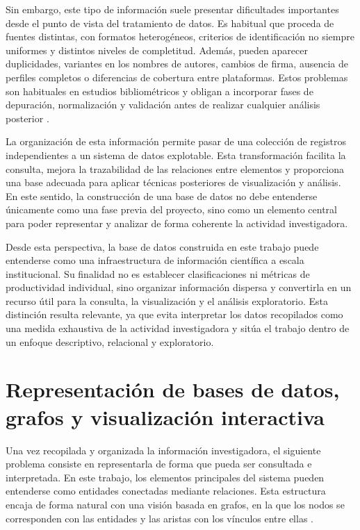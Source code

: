 \documentclass[11pt,spanish,listoffigures,listoftables]{tfgetsinf}
\begin{document}
Sin embargo, este tipo de información suele presentar dificultades importantes desde el punto de vista del tratamiento de datos. Es habitual que proceda de fuentes distintas, con formatos heterogéneos, criterios de identificación no siempre uniformes y distintos niveles de completitud. Además, pueden aparecer duplicidades, variantes en los nombres de autores, cambios de firma, ausencia de perfiles completos o diferencias de cobertura entre plataformas. Estos problemas son habituales en estudios bibliométricos y obligan a incorporar fases de depuración, normalización y validación antes de realizar cualquier análisis posterior \cite{moed,zupic}.

La organización de esta información permite pasar de una colección de registros independientes a un sistema de datos explotable. Esta transformación facilita la consulta, mejora la trazabilidad de las relaciones entre elementos y proporciona una base adecuada para aplicar técnicas posteriores de visualización y análisis. En este sentido, la construcción de una base de datos no debe entenderse únicamente como una fase previa del proyecto, sino como un elemento central para poder representar y analizar de forma coherente la actividad investigadora.

Desde esta perspectiva, la base de datos construida en este trabajo puede entenderse como una infraestructura de información científica a escala institucional. Su finalidad no es establecer clasificaciones ni métricas de productividad individual, sino organizar información dispersa y convertirla en un recurso útil para la consulta, la visualización y el análisis exploratorio. Esta distinción resulta relevante, ya que evita interpretar los datos recopilados como una medida exhaustiva de la actividad investigadora y sitúa el trabajo dentro de un enfoque descriptivo, relacional y exploratorio.

\section{Representación de bases de datos, grafos y visualización interactiva}

Una vez recopilada y organizada la información investigadora, el siguiente problema consiste en representarla de forma que pueda ser consultada e interpretada. En este trabajo, los elementos principales del sistema pueden entenderse como entidades conectadas mediante relaciones. Esta estructura encaja de forma natural con una visión basada en grafos, en la que los nodos se corresponden con las entidades y las aristas con los vínculos entre ellas \cite{newmannetworks}.
\end{document}
